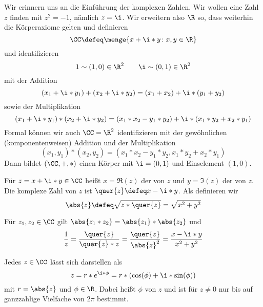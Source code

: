 Wir erinnern uns an die Einführung der komplexen Zahlen. Wir wollen eine Zahl $z$ finden mit $z^2 = -1$, nämlich $z = \i$. Wir erweitern also $\R$ so, dass weiterhin die Körperaxiome gelten und definieren
\begin{equation}
	\CC \defeq \menge{x + \i * y \colon x,y \in \R}
\end{equation}
und identifizieren
\begin{equation}
	1 \sim (1,0) \in \R^2 \qquad \i \sim (0,1) \in \R^2
\end{equation}
mit der Addition
\begin{equation}
	(x_1 + \i * y_1) + (x_2 + \i * y_2) = (x_1 + x_2) + \i * (y_1 + y_2)
\end{equation}
sowie der Multiplikation
\begin{equation}
	(x_1 + \i * y_1) * (x_2 + \i * y_2) = (x_1 * x_2 - y_1 * y_2) + \i * (x_1 * y_2 + x_2 * y_1)
\end{equation}
Formal können wir auch $\CC = \R^2$ identifizieren mit der gewöhnlichen (komponentenweisen) Addition und der Multiplikation
\begin{equation}
	(x_1, y_1) * (x_2, y_2) = (x_1 * x_2 - y_1 * y_2 , x_1 * y_2 + x_2 * y_1)
\end{equation}
Dann bildet $(\CC, +, *)$ einen Körper mit $\i = (0,1)$ und Einselement $(1,0)$.

\begin{definition}
	Für $z = x + \i * y \in \CC$ heißt $x = \Re(z)$ der  von $z$ und $y = \Im(z)$ der   von $z$. Die  komplexe Zahl von $z$ ist $\quer{z} \defeq x - \i * y$. Als  definieren wir
	\begin{equation}
	\abs{z} \defeq \sqrt{z * \quer{z}} = \sqrt{x^2 + y^2}
	\end{equation}
\end{definition}

Für $z_1, z_2 \in \CC$ gilt $\abs{z_1 * z_2} = \abs{z_1} * \abs{z_2}$ und
\begin{equation}
	\frac{1}{z} = \frac{\quer{z}}{\quer{z} * z} = \frac{\quer{z}}{\abs{z}^2} = \frac{x - \i * y}{x^2 + y^2}
\end{equation}

\begin{definition}[Polardarstellung]
	Jedes $z \in \CC$ lässt sich darstellen als
	\begin{equation}
		z = r * e^{\i * \phi} = r * (\cos(\phi) + \i * \sin(\phi))
	\end{equation}
	mit $r = \abs{z}$ und $\phi \in \R$. Dabei heißt $\phi$  von $z$ und ist für $z \neq 0$ nur bis auf ganzzahlige Vielfache von $2\pi$ bestimmt.
\end{definition}

